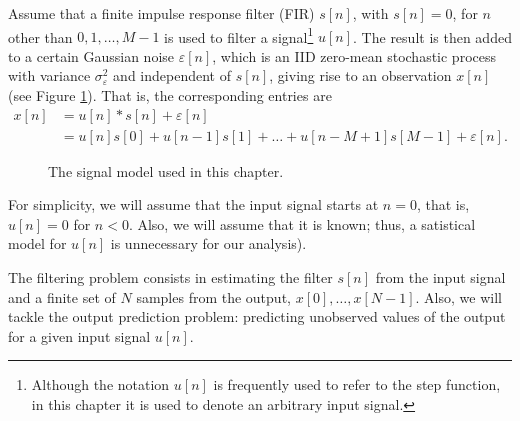 Assume that a finite impulse response filter (FIR) $s[n]$, with $s[n]=0$, for $n$ other than $0,1, \ldots, M-1$ is used to filter a signal\footnote{Although the notation $u[n]$ is frequently used to refer to the step function, in this chapter it is used to denote an arbitrary input signal.} $u[n]$. The result is then added to a certain Gaussian noise $\varepsilon[n]$, which is an IID zero-mean stochastic process with variance $\sigma_\varepsilon^2 $ and independent of $s[n]$, giving rise to an observation $x[n]$ (see Figure \ref{fig:linear_filter}). That is, the corresponding entries are
\begin{align}
x[n] &= u[n]*s[n] + \varepsilon[n]     \nonumber\\
     & = u[n]s[0] + u[n-1]s[1] + \ldots + u[n-M+1]s[M-1] + \varepsilon[n].
\end{align}

\begin{figure}[htb]  %
    \centering
\caption{The signal model used in this chapter.}
\label{fig:linear_filter}
\end{figure}

For simplicity, we will assume that the input signal starts at $n=0$, that is, $u[n]=0$ for $n<0$. Also, we will assume that it is known; thus, a satistical model for $u[n]$ is unnecessary for our analysis).

The filtering problem consists in estimating the filter $s[n]$ from the input signal and a finite set of $N$ samples from the output, $x[0],\ldots, x[N-1]$. Also, we will tackle the output prediction problem: predicting unobserved values of the output for a given input signal $u[n]$.

